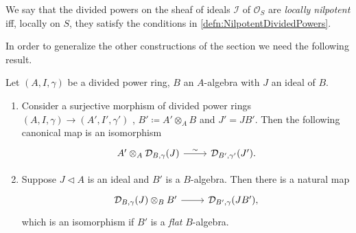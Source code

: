 \begin{defn}
	We say that the divided powers on the sheaf of ideals $\mathcal{I}$
	of $\mathcal{O}_{ S }$ are \emph{locally nilpotent} iff,
	locally on $S$, they satisfy the conditions in \cref{defn:NilpotentDividedPowers}.
\end{defn}


\noindent
In order to generalize the other constructions of the section
we need the following result.


\begin{prop}\label{prop:PDEnvScheme}
	Let $\left(A, I, \gamma\right)$ be a divided power ring, $B$
	an $A$-algebra with $J$ an ideal of $B$.
\begin{enumerate}
	\item Consider a surjective morphism of divided power rings
		$\left(A, I, \gamma\right) \to  \left(A', I', \gamma'\right)$ ,
		$B' \coloneqq A' \otimes_A B$ and $J' = JB'$.
		Then the following canonical map is an isomorphism
		\begin{equation*}
		\begin{tikzcd}[row sep = 0ex
			,/tikz/column 1/.append style={anchor=base east}
			,/tikz/column 2/.append style={anchor=base west}]
			A' \otimes_A \mathcal{D}_{B,\gamma}(J) \arrow[r, "\sim", rightarrow] &
			\mathcal{D}_{B',\gamma'}(J')
		.\end{tikzcd}
		\end{equation*} 

	\item Suppose $J \triangleleft A$ is an ideal and $B'$ is a $B$-algebra.
		Then there is a natural map
		\begin{equation*}
		\begin{tikzcd}[row sep = 0ex
			,/tikz/column 1/.append style={anchor=base east}
			,/tikz/column 2/.append style={anchor=base west}]
			\mathcal{D}_{B,\gamma}(J) \otimes_B B' \arrow[r, "", rightarrow] &
			\mathcal{D}_{B',\gamma}(JB')
		,\end{tikzcd}
		\end{equation*} 
		which is an isomorphism if $B'$ is a \emph{flat} $B$-algebra.
\end{enumerate}
\end{prop}


